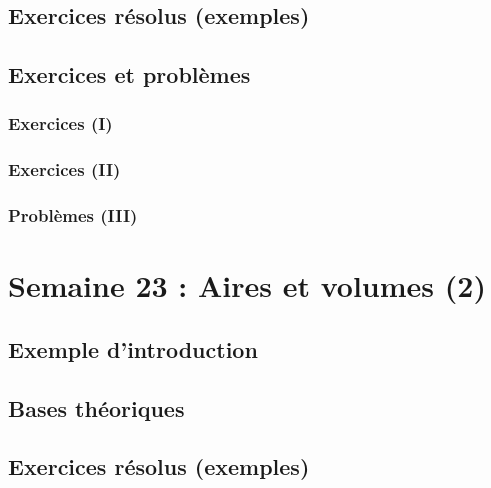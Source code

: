 \documentclass[
  12pt,
]{book}
\begin{document}
\hypertarget{exercices-ruxe9solus-exemples-21}{%
\section{Exercices résolus (exemples)}\label{exercices-ruxe9solus-exemples-21}}

\hypertarget{exercices-et-probluxe8mes-21}{%
\section{Exercices et problèmes}\label{exercices-et-probluxe8mes-21}}

\hypertarget{exercices-i-21}{%
\subsection{Exercices (I)}\label{exercices-i-21}}

\hypertarget{exercices-ii-21}{%
\subsection{Exercices (II)}\label{exercices-ii-21}}

\hypertarget{probluxe8mes-iii-21}{%
\subsection{Problèmes (III)}\label{probluxe8mes-iii-21}}

\hypertarget{semaine-23-aires-et-volumes-2}{%
\chapter{Semaine 23 : Aires et volumes (2)}\label{semaine-23-aires-et-volumes-2}}

\hypertarget{exemple-dintroduction-22}{%
\section{Exemple d'introduction}\label{exemple-dintroduction-22}}

\hypertarget{bases-thuxe9oriques-22}{%
\section{Bases théoriques}\label{bases-thuxe9oriques-22}}

\hypertarget{exercices-ruxe9solus-exemples-22}{%
\section{Exercices résolus (exemples)}\label{exercices-ruxe9solus-exemples-22}}
\end{document}
